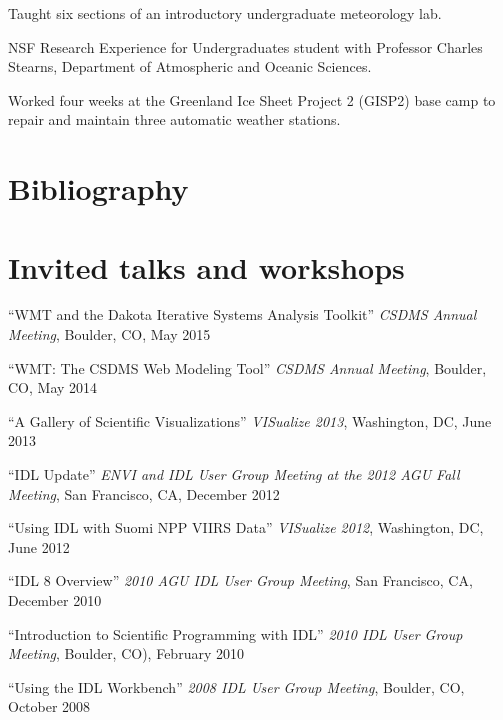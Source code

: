 \documentclass[letterpaper]{resume}
\begin{document}
\begin{compactitem}[\itembullet]
  \item Taught six sections of an introductory undergraduate
    meteorology lab.
\end{compactitem}

\begin{compactitem}[\itembullet]
  \item NSF Research Experience for Undergraduates student with
    Professor Charles Stearns, Department of Atmospheric and Oceanic
    Sciences.
  \item Worked four weeks at the Greenland Ice Sheet Project 2 (GISP2)
    base camp to repair and maintain three automatic weather stations.
\end{compactitem}


\section{Bibliography}

\nocite{*}




\section{Invited talks and workshops}

\vspace{1.0em}
\begin{compactitem}[\itembullet]
  \item ``WMT and the Dakota Iterative Systems Analysis Toolkit''
    \textit{CSDMS Annual Meeting}, Boulder, CO, May 2015
  \item ``WMT: The CSDMS Web Modeling Tool'' \textit{CSDMS Annual
    Meeting}, Boulder, CO, May 2014
  \item ``A Gallery of Scientific Visualizations'' \textit{VISualize
    2013}, Washington, DC, June 2013
  \item ``IDL Update'' \textit{ENVI and IDL User Group Meeting at the
    2012 AGU Fall Meeting}, San Francisco, CA, December 2012
  \item ``Using IDL with Suomi NPP VIIRS Data'' \textit{VISualize
    2012}, Washington, DC, June 2012
  \item ``IDL 8 Overview'' \textit{2010 AGU IDL User Group Meeting},
    San Francisco, CA, December 2010
  \item ``Introduction to Scientific Programming with IDL''
    \textit{2010 IDL User Group Meeting}, Boulder, CO), February 2010
  \item ``Using the IDL Workbench'' \textit{2008 IDL User Group
    Meeting}, Boulder, CO, October 2008
\end{compactitem}
\end{document}
